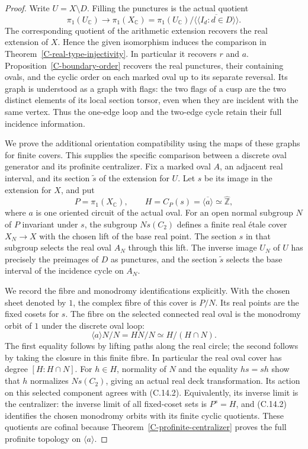 \begin{proof}
Write $U=X\setminus D$. Filling the punctures is the actual quotient
\[
 \pi_1(U_{\mathbb C})\longrightarrow\pi_1(X_{\mathbb C})
 =\pi_1(U_{\mathbb C})/
       \overline{\langle\!\langle I_d:d\in D\rangle\!\rangle}.
\tag{C.14.1}
\]
The corresponding quotient of the arithmetic extension recovers
the real extension of $X$. Hence the given isomorphism induces the
comparison in Theorem~\ref{C-real-type-injectivity}. In particular it
recovers $r$ and $a$. Proposition~\ref{C-boundary-order} recovers
the real punctures, their containing ovals, and the cyclic order
on each marked oval up to its separate reversal. Its graph is
understood as a graph with flags: the two flags of a cusp are the
two distinct elements of its local section torsor, even when they
are incident with the same vertex. Thus the one-edge loop and the
two-edge cycle retain their full incidence information.

We prove the additional orientation compatibility using the maps
of these graphs for finite covers. This supplies the specific
comparison between a discrete oval generator and its profinite
centralizer. Fix a marked oval $A$, an adjacent real interval,
and its section $\widetilde s$ of the extension for $U$. Let $s$
be its image in the extension for $X$, and put
\[
 P=\pi_1(X_{\mathbb C}),\qquad H=C_P(s)
       =\overline{\langle a\rangle}\simeq\widehat{\mathbb Z},
\]
where $a$ is one oriented circuit of the actual oval.
For an open normal subgroup $N$ of $P$ invariant under $s$, the
subgroup $N s(C_2)$ defines a finite real \'etale cover $X_N\to X$
with the chosen lift of the base real point. The section $s$ in
that subgroup selects the real oval $A_N$ through this lift.
The inverse image $U_N$ of $U$ has precisely the preimages of $D$
as punctures, and the section $\widetilde s$ selects the base
interval of the incidence cycle on $A_N$.

We record the fibre and monodromy identifications explicitly.
With the chosen sheet denoted by $1$, the complex fibre of this
cover is $P/N$. Its real points are the fixed cosets for $s$.
The fibre on the selected connected real oval is the monodromy
orbit of $1$ under the discrete oval loop:
\[
 \langle a\rangle N/N=HN/N\simeq H/(H\cap N).
\tag{C.14.2}
\]
The first equality follows by lifting paths along the real circle;
the second follows by taking the closure in this finite fibre.
In particular the real oval cover has degree
$[H:H\cap N]$. For $h\in H$, normality of $N$ and the equality
$hs=sh$ show that $h$ normalizes $Ns(C_2)$, giving an actual
real deck transformation. Its action on this selected component
agrees with (C.14.2). Equivalently,
its inverse limit is the centralizer: the inverse limit of all
fixed-coset sets is $P^s=H$, and (C.14.2) identifies the chosen
monodromy orbits with its finite cyclic quotients. These quotients
are cofinal because Theorem~\ref{C-profinite-centralizer} proves
the full profinite topology on $\langle a\rangle$.


\end{proof}
